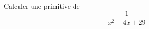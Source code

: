 Calculer une primitive de
\begin{displaymath}
 \frac{1}{x^2-4x+29}
\end{displaymath}
\bigskip \bigskip \bigskip